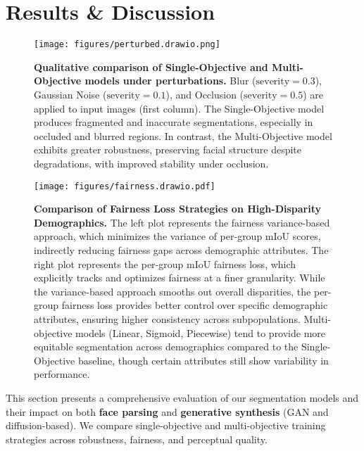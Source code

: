 \section{Results \& Discussion}
\label{sec:results}
\begin{figure}[htbp]

        \texttt{[image: figures/perturbed.drawio.png]}
        \label{fig:single_objective_blur}
    \caption{\textbf{Qualitative comparison of Single-Objective and Multi-Objective models under perturbations.}  
Blur (\(\text{severity} = 0.3\)), Gaussian Noise (\(\text{severity} = 0.1\)), and Occlusion (\(\text{severity} = 0.5\)) are applied to input images (first column). The Single-Objective model produces fragmented and inaccurate segmentations, especially in occluded and blurred regions. In contrast, the Multi-Objective model exhibits greater robustness, preserving facial structure despite degradations, with improved stability under occlusion.}
\label{fig:qualitative_results_comparison}
\end{figure}

\begin{figure*}[htb]
    \centering
    \texttt{[image: figures/fairness.drawio.pdf]}
    \caption{
        \textbf{Comparison of Fairness Loss Strategies on High-Disparity Demographics.} 
        The left plot represents the fairness variance-based approach, which minimizes the variance of per-group mIoU scores, indirectly reducing fairness gaps across demographic attributes. The right plot represents the per-group mIoU fairness loss, which explicitly tracks and optimizes fairness at a finer granularity. While the variance-based approach smooths out overall disparities, the per-group fairness loss provides better control over specific demographic attributes, ensuring higher consistency across subpopulations. Multi-objective models (Linear, Sigmoid, Piecewise) tend to provide more equitable segmentation across demographics compared to the Single-Objective baseline, though certain attributes still show variability in performance.
    }
    \label{fig:fairness_comparison}
\end{figure*}


This section presents a comprehensive evaluation of our segmentation models and their impact on both \textbf{face parsing} and \textbf{generative synthesis} (GAN and diffusion-based). We compare single-objective and multi-objective training strategies across robustness, fairness, and perceptual quality.


